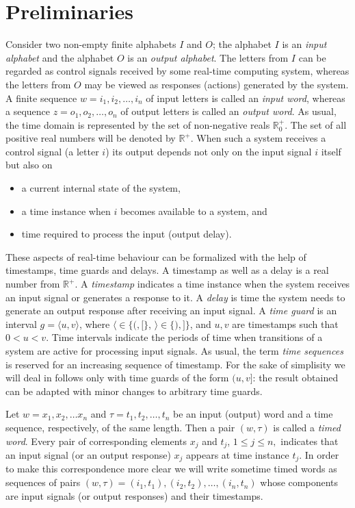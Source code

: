 \documentclass[conference]{IEEEtran}
\begin{document}
\section{Preliminaries}

Consider two non-empty finite alphabets $I$ and $O$; the alphabet $I$ is an \emph{input alphabet} and the alphabet $O$ is an \emph{output alphabet}. The letters from $I$ can be regarded as control signals received by some real-time computing system, whereas the letters from $O$ may be viewed as responses (actions) generated by the system. A finite sequence $w = i_1, i_2, \dots, i_n$  of input letters is called an \emph{ input word}, whereas a sequence $z = o_1, o_2, \dots, o_n$ of output letters is called an \emph{output word}.
As usual, the time domain is represented by the set of non-negative reals $\mathbb{R}_0^+$. The set of all positive real numbers will be denoted by $\mathbb{R}^+$. When such a system receives a control signal (a letter $i$) its output depends not only on the input signal $i$ itself but also on
\begin{itemize}
	\item a current internal state of the system,
	\item a time instance when $i$ becomes available to a system, and
	\item time required to process the input (output delay).
\end{itemize}
These aspects of real-time behaviour can be formalized with the help of timestamps, time guards and delays. A timestamp as well as a delay is a real number from $\mathbb{R}^{+}$. A \emph{timestamp} indicates a time instance when the system receives an input signal or generates a response to it. A \emph{delay} is time the system needs to generate an output response after receiving an input signal. A \emph{time guard} is an interval $g = \langle u, v \rangle$, where $\langle \in \{ (, [ \}$, $\rangle \in \{ ), ] \}$, and $u, v$ are timestamps such that $0 < u < v$. Time intervals indicate the periods of time when transitions of a system are active for processing input signals. As usual, the term \emph{time sequences} is reserved for an increasing sequence of timestamp. For the sake of simplisity we will deal in follows only with time guards of the form $(u,v]$: the result obtained can be adapted with minor changes to arbitrary time guards. 

Let $w = x_1, x_2, \dots x_n$ and $\tau = t_1, t_2, \dots, t_n$ be an input (output) word and a time sequence, respectively, of the same length. Then a pair $(w, \tau )$ is called a \emph{timed word}. Every pair of corresponding elements $x_j$ and $t_j$, $1\leq j \leq n,$  indicates that an input signal (or an output response) $x_j$ appears at time instance $t_j$. In order to make this correspondence more clear we will write sometime timed words as sequences of pairs $(w, \tau ) = (i_1, t_1), (i_2, t_2), \dots, (i_n, t_n)$  whose components are input signals (or output responses) and their timestamps.   
 
\end{document}
